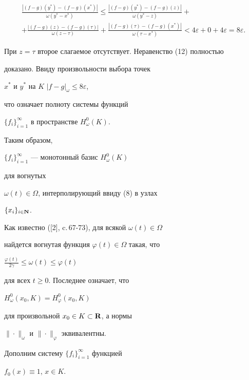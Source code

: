 \begin{pf}
\begin{multline*}
\frac{|(f-g)(y^*)-(f-g)(x^*)|}{\omega(y^*-x^*)}\le


\frac{|(f-g)(y^*)-(f-g)(z)|}{\omega(y^*-z)}+ \\


+\frac{|(f-g)(z)-(f-g)(\tau)|}{\omega(z-\tau)}+


\frac{|(f-g)(\tau)-(f-g)(x^*)|}{\omega(\tau-x^*)}<


4\varepsilon+0+4\varepsilon=8\varepsilon.


\end{multline*}


При $z=\tau$ второе слагаемое отсутствует. Неравенство (12) полностью


доказано. Ввиду произвольности выбора точек


$x^*$ и $y^*$ на $K$\; $|f-g|_\omega\le 8\varepsilon$,


что означает полноту системы функций


$\{f_i\}^\infty_{i=1}$ в пространстве $H^0_\omega(K)$.





Таким образом,


$\{f_i\}^\infty_{i=1}$ --- монотонный базис $H^0_\omega(K)$


для вогнутых


$\omega(t)\in\Omega$, интерполирующий ввиду (8) в узлах


$\{x_i\}_{i\in\bold N}$.





Как известно ([2], c.\,67-73), для всякой $\omega (t)\in\Omega$


найдется вогнутая функция $\varphi (t)\in\Omega$ такая, что


$\frac{\varphi (t)}{2\gamma} \le\omega (t) \le \varphi (t)$


для всех $t\ge 0$. Последнее означает, что


$H^0_\omega (x_0,K) =H^0_\varphi (x_0,K)$


для произвольной  $x_0\in K\subset\bold R$, а нормы


$\|\cdot\|_\omega$ и $\|\cdot\|_\varphi$ эквивалентны.


\end{pf}





Дополним систему $\{f_i\}^\infty_{i=1}$ функцией


$f_0(x)\equiv 1$, $x\in K$.





